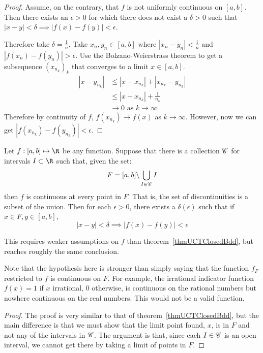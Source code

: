 \documentclass[../Main.tex]{subfiles}
\begin{document}
\begin{proof}
    Assume, on the contrary, that $f$ is not uniformly continuous on $[a, b]$. Then there exists an $\epsilon > 0$ for which there does not exist a $\delta > 0$ such that $|x - y| < \delta \implies |f(x) - f(y)| < \epsilon$. 

    Therefore take $\delta = \frac{1}{n}$. Take $x_n, y_n \in [a, b]$ where $|x_n - y_n| < \frac{1}{n}$ and $|f(x_n) - f(y_n)| > \epsilon$. Use the Bolzano-Weierstrass theorem to get a subsequence $(x_{n_k})_k$ that converges to a limit $x \in [a, b]$.
    \begin{align*}
        |x-y_{n_k}| &\leq |x-x_{n_k}| + |x_{n_k} - y_{n_k}| \\
        &\leq |x - x_{n_k}| + \frac{1}{n_k} \\
        &\to 0 \text{ as } k \to \infty
    \end{align*}
    Therefore by continuity of $f$, $f(x_{n_k}) \to f(x)$ as $k \to \infty$. However, now we can get $|f(x_{n_k}) - f(y_{n_k})| < \epsilon$.\contradiction
\end{proof}
\begin{theorem}
    Let $f : [a, b] \mapsto \R$ be any function. Suppose that there is a collection $\mathscr{C}$ for intervals $I \subset \R$ such that, given the set:
    \begin{equation*}
        F = [a, b] \backslash \bigcup_{I \in \mathscr{C}} I
    \end{equation*}
    then $f$ is continuous at every point in $F$. That is, the set of discontinuities is a subset of the union. Then for each $\epsilon > 0$, there exists a $\delta(\epsilon)$ such that if $x \in F, y \in [a, b]$,
    \begin{equation*}
        |x - y| < \delta \implies |f(x) - f(y)| < \epsilon
    \end{equation*}
    \label{thmUCTSubsetClosedBdd}
\end{theorem}
\begin{remarks}
    \item This requires weaker assumptions on $f$ than theorem~\ref{thmUCTClosedBdd}, but reaches roughly the same conclusion.
    \item Note that the hypothesis here is stronger than simply saying that the function $f_F$ restricted to $f$ is continuous on $F$. For example, the irrational indicator function $f(x) = 1$ if $x$ irrational, $0$ otherwise, is continuous on the rational numbers but nowhere continuous on the real numbers. This would not be a valid function.
\end{remarks}
\begin{proof}
    The proof is very similar to that of theorem~\ref{thmUCTClosedBdd}, but the main difference is that we must show that the limit point found, $x$, is in $F$ and not any of the intervals in $\mathscr{C}$. The argument is that, since each $I \in \mathscr{C}$ is an open interval, we cannot get there by taking a limit of points in $F$.
\end{proof}
\end{document}
